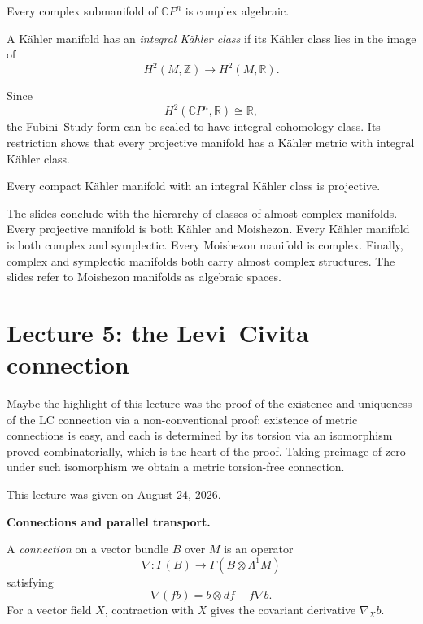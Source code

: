 \begin{theorem}[Chow]
\label{theorem-chow-projective}
Every complex submanifold of
$\mathbb{C}P^n$ is complex algebraic.
\end{theorem}

\begin{definition}
\label{definition-integral-kahler-class}
A K\"ahler manifold has an
{\it integral K\"ahler class} if its K\"ahler
class lies in the image of
$$
H^2(M,\mathbb{Z})
\longrightarrow H^2(M,\mathbb{R}).
$$
\end{definition}

Since
$$
H^2(\mathbb{C}P^n,\mathbb{R})
\cong\mathbb{R},
$$
the Fubini--Study form can be scaled to
have integral cohomology class. Its
restriction shows that every projective
manifold has a K\"ahler metric with integral
K\"ahler class.

\begin{theorem}
\label{theorem-kodaira-embedding}
Every compact K\"ahler manifold with an
integral K\"ahler class is projective.
\end{theorem}

The slides conclude with the hierarchy of
classes of almost complex manifolds. Every
projective manifold is both K\"ahler and
Moishezon. Every K\"ahler manifold is both
complex and symplectic. Every Moishezon
manifold is complex. Finally, complex and
symplectic manifolds both carry almost
complex structures. The slides refer to
Moishezon manifolds as algebraic spaces.

\section{Lecture 5: the Levi--Civita
connection}
\label{section-lecture-five-levi-civita}

\noindent
Maybe the highlight of this lecture
was the proof of the existence
and uniqueness of the LC connection
via a non-conventional proof:
existence of metric connections is easy,
and each is determined by its torsion
via an isomorphism proved
combinatorially, which is the heart
of the proof. Taking preimage of zero
under such isomorphism we obtain
a metric torsion-free connection.

\medskip\noindent
This lecture was given on August 24, 2026.

\medskip\noindent
{\bf Connections and parallel transport.}

\begin{definition}
\label{definition-vector-bundle-connection}
A {\it connection} on a vector bundle $B$
over $M$ is an operator
$$
\nabla:\Gamma(B)
\longrightarrow
\Gamma(B\otimes\Lambda^1M)
$$
satisfying
$$
\nabla(fb)=b\otimes df+f\nabla b.
$$
For a vector field $X$, contraction with
$X$ gives the covariant derivative
$\nabla_Xb$.
\end{definition}

